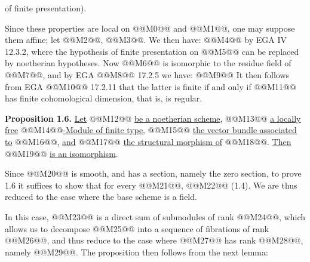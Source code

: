 of finite presentation).

Since these properties are local on @@M0@@ and @@M1@@, one may suppose them affine; let @@M2@@, @@M3@@. We then have:
@@M4@@
by EGA IV 12.3.2, where the hypothesis of finite presentation on @@M5@@ can be replaced by noetherian hypotheses. Now @@M6@@ is isomorphic to the residue field of @@M7@@, and by EGA @@M8@@ 17.2.5 we have:
@@M9@@
It then follows from EGA @@M10@@ 17.2.11 that the latter is finite if and only if @@M11@@ has finite cohomological dimension, that is, is regular.

\textbf{Proposition 1.6.} \uline{Let} @@M12@@ \uline{be a noetherian scheme}, @@M13@@ \uline{a locally free} @@M14@@\uline{-Module of finite type}, @@M15@@ \uline{the vector bundle associated to} @@M16@@, \uline{and} @@M17@@ \uline{the structural morphism of} @@M18@@. \uline{Then} @@M19@@ \uline{is an isomorphism}.

Since @@M20@@ is smooth, and has a section, namely the zero section, to prove 1.6 it suffices to show that for every @@M21@@, @@M22@@ (1.4). We are thus reduced to the case where the base scheme is a field.

In this case, @@M23@@ is a direct sum of submodules of rank @@M24@@, which allows us to decompose @@M25@@ into a sequence of fibrations of rank @@M26@@, and thus reduce to the case where @@M27@@ has rank @@M28@@, namely @@M29@@. The proposition then follows from the next lemma:
